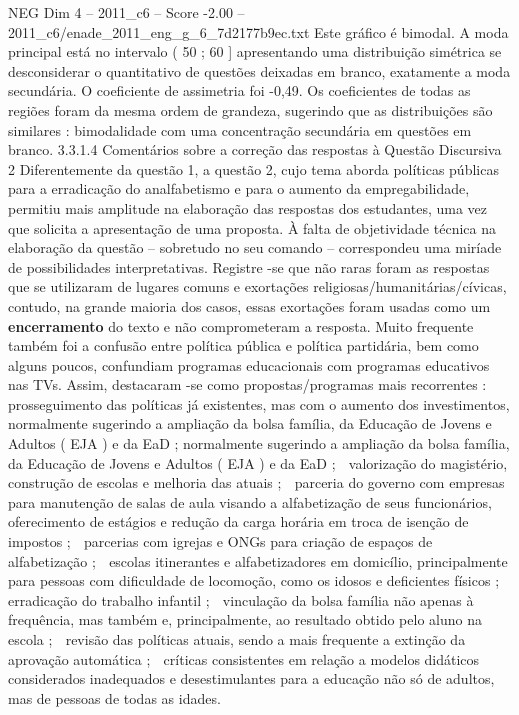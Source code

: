 \begin{textsample}{NEG Dim 4 – 2011\_c6 – Score -2.00 – 2011\_c6/enade\_2011\_eng\_g\_6\_7d2177b9ec.txt}
Este gráfico é bimodal.
A moda principal está no intervalo ( 50 ; 60 ] apresentando uma distribuição simétrica se desconsiderar o quantitativo de questões deixadas em branco, exatamente a moda secundária.
O coeficiente de assimetria foi -0,49.
Os coeficientes de todas as regiões foram da mesma ordem de grandeza, sugerindo que as distribuições são similares : bimodalidade com uma concentração secundária em questões em branco. 3.3.1.4 Comentários sobre a correção das respostas à Questão Discursiva 2 Diferentemente da questão 1, a questão 2, cujo tema aborda políticas públicas para a erradicação do analfabetismo e para o aumento da empregabilidade, permitiu mais amplitude na elaboração das respostas dos estudantes, uma vez que solicita a apresentação de uma proposta.
À falta de objetividade técnica na elaboração da questão – sobretudo no seu comando – correspondeu uma miríade de possibilidades interpretativas.
Registre -se que não raras foram as respostas que se utilizaram de lugares comuns e exortações religiosas/humanitárias/cívicas, contudo, na grande maioria dos casos, essas exortações foram usadas como um \textbf{encerramento} do texto e não comprometeram a resposta.
Muito frequente também foi a confusão entre política pública e política partidária, bem como alguns poucos, confundiam programas educacionais com programas educativos nas TVs.
Assim, destacaram -se como propostas/programas mais recorrentes :  prosseguimento das políticas já existentes, mas com o aumento dos investimentos, normalmente sugerindo a ampliação da bolsa família, da Educação de Jovens e Adultos ( EJA ) e da EaD ; normalmente sugerindo a ampliação da bolsa família, da Educação de Jovens e Adultos ( EJA ) e da EaD ;  valorização do magistério, construção de escolas e melhoria das atuais ;  parceria do governo com empresas para manutenção de salas de aula visando a alfabetização de seus funcionários, oferecimento de estágios e redução da carga horária em troca de isenção de impostos ;  parcerias com igrejas e ONGs para criação de espaços de alfabetização ;  escolas itinerantes e alfabetizadores em domicílio, principalmente para pessoas com dificuldade de locomoção, como os idosos e deficientes físicos ;  erradicação do trabalho infantil ;  vinculação da bolsa família não apenas à frequência, mas também e, principalmente, ao resultado obtido pelo aluno na escola ;  revisão das políticas atuais, sendo a mais frequente a extinção da aprovação automática ;  críticas consistentes em relação a modelos didáticos considerados inadequados e desestimulantes para a educação não só de adultos, mas de pessoas de todas as idades.

\end{textsample}
